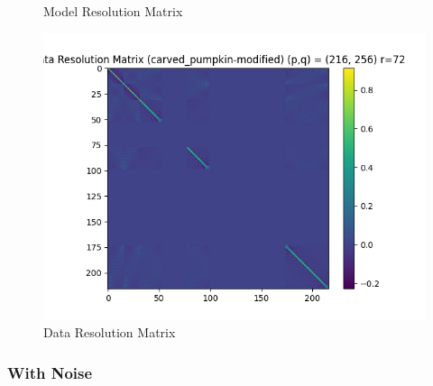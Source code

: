 \documentclass{article}
\begin{document}
\begin{itemize}
\begin{figure}[h]
    \caption{Model Resolution Matrix}
\end{figure}
\begin{figure}[h]
    \centering
    \includegraphics[width=1\textwidth]{images/outputs/datares/carved_pumpkin-modified.png}
    \caption{Data Resolution Matrix}
\end{figure}
\clearpage


    

\end{itemize}

\subsubsection{With Noise}
\end{document}
